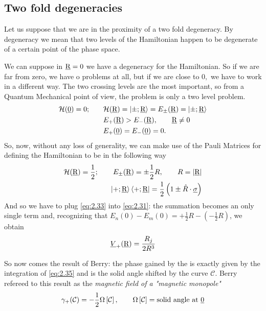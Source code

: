 \subsection{Two fold degeneracies}
Let us suppose that we are in the proximity of a two fold degeneracy. By degeneracy we mean that two levels of the Hamiltonian happen to be degenerate of a certain point of the phase space.


We can suppose in $ \underline{\textrm{R}}=0 $ we have a degeneracy for the Hamiltonian. So if we are far from zero, we have o problems at all, but if we are close to $ 0, $ we have to work in a different way. The two crossing levels are the most important, so from a Quantum Mechanical point of view, the problem is only a two level problem.
\begin{align}
	\mathcal{H}(\underline{0})=0; \qquad & \mathcal{H}(\underline{\textrm{R}})=\Ket{\pm;\underline{\textrm{R}}}=E_{\pm}(\underline{\textrm{R}})=\Ket{\pm;\underline{\textrm{R}}}\\
	& E_{+}(\underline{\textrm{R}})>E_-(\underline{\textrm{R}}),\qquad \underline{\textrm{R}}\neq 0\\
	& E_{+}(\underline{0})=E_{-}(\underline{0})=0.
\end{align} 
So, now, without any loss of generality, we can make use of the Pauli Matrices for defining the Hamiltonian to be in the following way
\begin{align}
	\mathcal{H}(\underline{\textrm{R}})=\dfrac{1}{2};\qquad E_{\pm}(\underline{\textrm{R}})=\pm\dfrac{1}{2}R, \qquad R=\lvert\underline{\textrm{R}}\rvert\\
	\Ket{+;\underline{\textrm{R}}}\Bra{+;\underline{\textrm{R}}}=\dfrac{1}{2}\left(1\pm \hat{R}\cdot\underline{\sigma} \right)\label{eq:2.33}
\end{align}
And so we have to plug \eqref{eq:2.33} into \eqref{eq:2.31}: the summation becomes an only single term and, recognizing that $ E_n(0)-E_m(0)=+\frac{1}{2}R-(-\frac{1}{2}R) $, we obtain 
\begin{equation}
\underline{V}_{+}(\underline{\textrm{R}})=\frac{R_j}{2R^3}
\label{eq:2.35}
\end{equation}

So now comes the result of Berry: the phase gained by the \wf is exactly given by the integration of \eqref{eq:2.35} and is the solid angle shifted by the curve $ \mathcal{C} $. Berry refereed to this result as the \textit{magnetic field of a "magnetic monopole"}
\begin{equation}
\gamma_{+}(\mathcal{C})=-\dfrac{1}{2}\Omega\left[\mathcal{C}\right], \qquad \Omega\left[\mathcal{C}\right]=\text{solid angle at \underline{0}}
\end{equation}